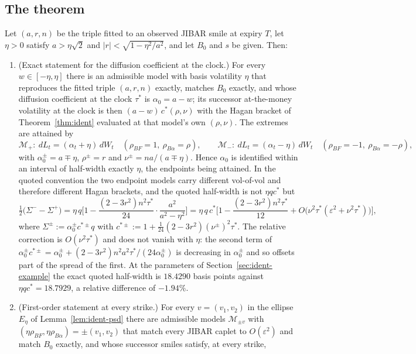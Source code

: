 \documentclass[../../../main.tex]{subfiles}
\begin{document}
\subsection{The theorem}

\begin{theorem}\label{thm:ident-two}
Let $(a,r,n)$ be the triple fitted to an observed JIBAR smile at expiry $T$, let $\eta>0$ satisfy $a>\eta\sqrt2$ and $|r|<\sqrt{1-\eta^2/a^2}$, and let $B_0$ and $s$ be given. Then:
\begin{enumerate}[label=(\roman*)]
\item (Exact statement for the diffusion coefficient at the clock.) For every $w\in[-\eta,\eta]$ there is an admissible model with basis volatility $\eta$ that reproduces the fitted triple $(a,r,n)$ exactly, matches $B_0$ exactly, and whose diffusion coefficient at the clock $\tau^*$ is $\alpha_0=a-w$; its successor at-the-money volatility at the clock is then $(a-w)\,c^*(\rho,\nu)$ with the Hagan bracket of Theorem~\ref{thm:ident} evaluated at that model's own $(\rho,\nu)$. The extremes are attained by
\[
\mathcal M_+:\ dL_t=(\alpha_t+\eta)\,dW_t\quad(\rho_{BF}=1,\ \rho_{B\alpha}=\rho),\qquad
\mathcal M_-:\ dL_t=(\alpha_t-\eta)\,dW_t\quad(\rho_{BF}=-1,\ \rho_{B\alpha}=-\rho),
\]
with $\alpha_0^{\pm}=a\mp\eta$, $\rho^{\pm}=r$ and $\nu^{\pm}=na/(a\mp\eta)$. Hence $\alpha_0$ is identified within an interval of half-width exactly $\eta$, the endpoints being attained. In the quoted convention the two endpoint models carry different vol-of-vol and therefore different Hagan brackets, and the quoted half-width is not $\eta qc^*$ but
\begin{equation}\label{eq:ident-quotedhw}
\tfrac12\big(\Sigma^--\Sigma^+\big)
=\eta\,q\Big[1-\frac{(2-3r^2)n^2\tau^*}{24}\cdot\frac{a^2}{a^2-\eta^2}\Big]
=\eta\,q\,c^*\Big[1-\frac{(2-3r^2)n^2\tau^*}{12}+O\big(\nu^2\tau^*(\varepsilon^2+\nu^2\tau^*)\big)\Big],
\end{equation}
where $\Sigma^{\pm}:=\alpha_0^{\pm}c^{*\pm}q$ with $c^{*\pm}:=1+\tfrac1{24}(2-3r^2)(\nu^{\pm})^2\tau^*$. The relative correction is $O(\nu^2\tau^*)$ and does not vanish with $\eta$: the second term of $\alpha_0^{\pm}c^{*\pm}=\alpha_0^{\pm}+(2-3r^2)n^2a^2\tau^*/(24\alpha_0^{\pm})$ is decreasing in $\alpha_0^{\pm}$ and so offsets part of the spread of the first. At the parameters of Section~\ref{sec:ident-example} the exact quoted half-width is $18.4290$ basis points against $\eta qc^*=18.7929$, a relative difference of $-1.94\%$.
\item (First-order statement at every strike.) For every $v=(v_1,v_2)$ in the ellipse $E_\eta$ of Lemma~\ref{lem:ident-psd} there are admissible models $\mathcal M_{\pm v}$ with $(\eta\rho_{BF},\eta\rho_{B\alpha})=\pm(v_1,v_2)$ that match every JIBAR caplet to $O(\varepsilon^2)$ and match $B_0$ exactly, and whose successor smiles satisfy, at every strike,

\end{enumerate}
\end{theorem}
\end{document}
